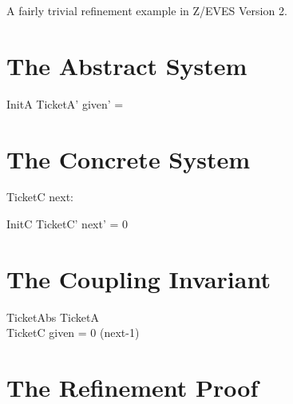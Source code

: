 \documentclass{article}
\begin{document}
A fairly trivial refinement example in Z/EVES Version 2.

\section{The Abstract System}


\begin{schema}{InitA}
  TicketA'
\where
  given' = \emptyset
\end{schema}


\section{The Concrete System}

\begin{schema}{TicketC}
  next: \nat
\end{schema}

\begin{schema}{InitC}
  TicketC'
\where
  next' = 0
\end{schema}


\section{The Coupling Invariant}

\begin{schema}{TicketAbs}
  TicketA \\
  TicketC
\where
  given = 0 \upto (next-1)
\end{schema}

\section{The Refinement Proof}
\end{document}
